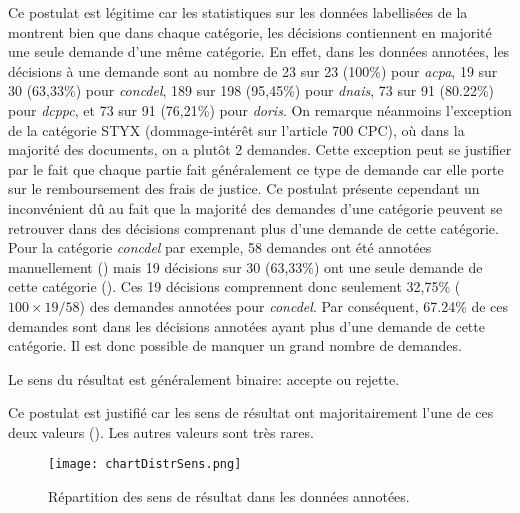 Ce postulat est légitime car les statistiques sur les données labellisées de la  montrent bien que dans chaque catégorie, les décisions contiennent en majorité une seule demande d'une même catégorie. En effet, dans les données annotées, les décisions à une demande sont au nombre de 23 sur 23 (100\%) pour \textit{acpa}, 19 sur 30 (63,33\%) pour \textit{concdel}, 189 sur 198 (95,45\%) pour \textit{dnais}, 73 sur 91 (80.22\%) pour \textit{dcppc}, et 73 sur 91 (76,21\%) pour \textit{doris}. On remarque néanmoins l'exception de la catégorie STYX (dommage-intérêt sur l'article 700 CPC), où dans la majorité des documents, on a plutôt 2 demandes. Cette exception peut se justifier par le fait que chaque partie fait généralement ce type de demande car elle porte sur le remboursement des frais de justice. Ce postulat présente cependant un inconvénient dû au fait que la majorité des demandes d'une catégorie peuvent se retrouver dans des décisions comprenant plus d'une demande de cette catégorie. Pour la catégorie \textit{concdel} par exemple, 58 demandes ont été annotées manuellement () mais 19 décisions sur 30 (63,33\%) ont une seule demande de cette catégorie (). Ces 19 décisions comprennent donc seulement 32,75\% ($100 \times 19 / 58$) des demandes annotées pour \textit{concdel}. Par conséquent, 67.24\% de ces demandes sont dans les décisions annotées ayant plus d'une demande de cette catégorie. Il est donc possible de manquer un grand nombre de demandes. %

\begin{postulat}\label{postulat:sens:sensbinaire}
Le sens du résultat est généralement binaire: accepte ou rejette.
\end{postulat} 
Ce postulat est justifié car les sens de résultat ont majoritairement l'une de ces deux valeurs (). Les autres valeurs sont très rares.

\begin{figure}[!htb]
\centering
\texttt{[image: chartDistrSens.png]}
\caption{Répartition des sens de résultat dans les données annotées.}\label{stat-sensrst}
\end{figure}

